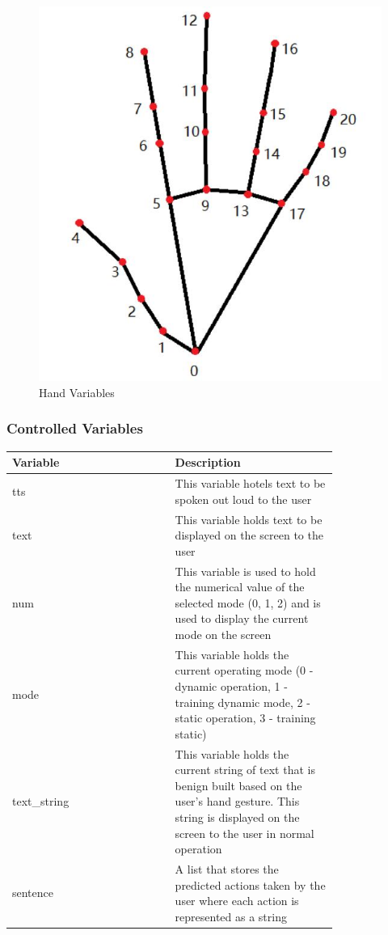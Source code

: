 \documentclass[12pt]{article}
\begin{document}
\begin{figure}[H] 
\centering
\includegraphics[width=\textwidth,height=0.88\textheight,keepaspectratio]{Hand.jpg} 
\caption{Hand Variables} 
\label{Fig.Monitor_Variables} 
\end{figure}

\subsubsection{Controlled Variables}

\renewcommand{\arraystretch}{1.2}
\noindent \begin{tabularx}{\textwidth}{p{0.4\linewidth}|p{0.4\linewidth}}
\toprule
\textbf{Variable} & \textbf{Description}\\
\midrule
tts 
& This variable hotels text to be spoken out loud to the user\\
\hline
text
& This variable holds text to be displayed on the screen to the user\\
\hline
num
& This variable is used to hold the numerical value of the selected mode (0, 1, 2) and is used to display the current mode on the screen\\
\hline
mode
& This variable holds the current operating mode (0 - dynamic operation, 1 - training dynamic mode, 2 - static operation, 3 - training static)\\
\hline
text\_string
& This variable holds the current string of text that is benign built based on the user’s hand gesture. This string is displayed on the screen to the user in normal operation\\
\hline
sentence
& A list that stores the predicted actions taken by the user where each action is represented as a string\\
\bottomrule
\end{tabularx}
\end{document}
